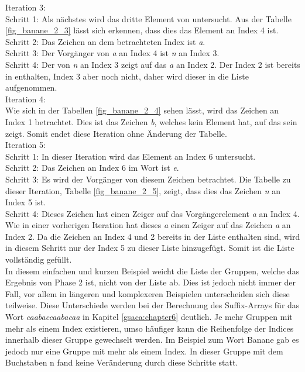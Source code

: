Iteration 3: \\
Schritt 1: Als nächstes wird das dritte Element von \sa untersucht. 
Aus der Tabelle \ref{fig_banane_2_3} lässt sich erkennen, dass dies das Element an Index 4 ist.\\
Schritt 2: Das Zeichen an dem betrachteten Index ist \textit{a}.\\
Schritt 3: Der Vorgänger von \textit{a} an Index 4 ist \textit{n} an Index 3.\\
Schritt 4: Der \prevpointer von \textit{n} an Index 3 zeigt auf das \textit{a} an Index 2. 
Der Index 2 ist bereits in \sa enthalten, Index 3 aber noch nicht, daher wird dieser in die Liste aufgenommen.\\

Iteration 4: \\
Wie sich in der Tabellen \ref{fig_banane_2_4} sehen lässt, wird das Zeichen an Index 1 betrachtet. 
Dies ist das Zeichen \textit{b}, welches kein Element hat, auf das sein \prevpointer zeigt. 
Somit endet diese Iteration ohne Änderung der Tabelle.\\

Iteration 5: \\
Schritt 1: In dieser Iteration wird das Element an Index 6 untersucht.\\
Schritt 2: Das Zeichen an Index 6 im Wort ist \textit{e}.\\
Schritt 3: Es wird der Vorgänger von diesem Zeichen betrachtet. 
Die Tabelle zu dieser Iteration, Tabelle \ref{fig_banane_2_5}, zeigt, dass dies das Zeichen \textit{n} an Index 5 ist.\\
Schritt 4: Dieses Zeichen hat einen Zeiger auf das Vorgängerelement \textit{a} an Index 4. 
Wie in einer vorherigen Iteration hat dieses \textit{a} einen Zeiger auf das Zeichen \textit{a} an Index 2. 
Da die Zeichen an Index 4 und 2 bereits in der Liste \sa enthalten sind, wird in diesem Schritt nur der Index 5 zu dieser Liste hinzugefügt. 
Somit ist die Liste vollständig gefüllt.\\

In diesem einfachen und kurzen Beispiel weicht die Liste der Gruppen, welche das Ergebnis von Phase 2 ist, nicht von der Liste \sa ab.
Dies ist jedoch nicht immer der Fall, vor allem in längeren und komplexeren Beispielen unterscheiden sich diese teilweise. 
Diese Unterschiede werden bei der Berechnung des Suffix-Arrays für das Wort \textit{caabaccaabacaa} in Kapitel \ref{gsaca:chapter6} deutlich. 
Je mehr Gruppen mit mehr als einem Index existieren, umso häufiger kann die Reihenfolge der Indices innerhalb dieser Gruppe gewechselt werden. 
Im Beispiel zum Wort Banane gab es jedoch nur eine Gruppe mit mehr als einem Index. 
In dieser Gruppe mit dem Buchstaben n fand keine Veränderung durch diese Schritte statt.\\
\newpage

